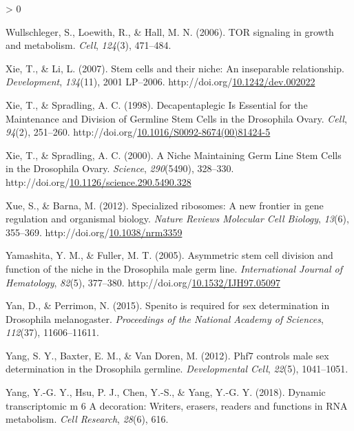 \documentclass[12pt,oneside]{reedthesis}
\newlength{\cslhangindent}
\newenvironment{CSLReferences}[2] %
 {%
  \setlength{\parindent}{0pt}
  \ifodd #1 \everypar{\setlength{\hangindent}{\cslhangindent}}\ignorespaces\fi
  \ifnum #2 > 0
  \setlength{\parskip}{#2\baselineskip}
  \fi
 }%
 {}
\begin{document}
\begin{CSLReferences}{1}{0}
\leavevmode\hypertarget{ref-Wullschleger2006b}{}%
Wullschleger, S., Loewith, R., \& Hall, M. N. (2006). {TOR} signaling in growth and metabolism. \emph{Cell}, \emph{124}(3), 471--484.

\leavevmode\hypertarget{ref-Xie2007a}{}%
Xie, T., \& Li, L. (2007). Stem cells and their niche: An inseparable relationship. \emph{Development}, \emph{134}(11), 2001 LP--2006. http://doi.org/\href{https://doi.org/10.1242/dev.002022}{10.1242/dev.002022}

\leavevmode\hypertarget{ref-Xie1998d}{}%
Xie, T., \& Spradling, A. C. (1998). Decapentaplegic {Is Essential} for the {Maintenance} and {Division} of {Germline Stem Cells} in the {Drosophila Ovary}. \emph{Cell}, \emph{94}(2), 251--260. http://doi.org/\href{https://doi.org/10.1016/S0092-8674(00)81424-5}{10.1016/S0092-8674(00)81424-5}

\leavevmode\hypertarget{ref-Xie2000b}{}%
Xie, T., \& Spradling, A. C. (2000). A {Niche Maintaining Germ Line Stem Cells} in the {Drosophila Ovary}. \emph{Science}, \emph{290}(5490), 328--330. http://doi.org/\href{https://doi.org/10.1126/science.290.5490.328}{10.1126/science.290.5490.328}

\leavevmode\hypertarget{ref-Xue2012}{}%
Xue, S., \& Barna, M. (2012). Specialized ribosomes: A new frontier in gene regulation and organismal biology. \emph{Nature Reviews Molecular Cell Biology}, \emph{13}(6), 355--369. http://doi.org/\href{https://doi.org/10.1038/nrm3359}{10.1038/nrm3359}

\leavevmode\hypertarget{ref-Yamashita2005d}{}%
Yamashita, Y. M., \& Fuller, M. T. (2005). Asymmetric stem cell division and function of the niche in the {Drosophila} male germ line. \emph{International Journal of Hematology}, \emph{82}(5), 377--380. http://doi.org/\href{https://doi.org/10.1532/IJH97.05097}{10.1532/IJH97.05097}

\leavevmode\hypertarget{ref-Yan2015}{}%
Yan, D., \& Perrimon, N. (2015). Spenito is required for sex determination in {Drosophila} melanogaster. \emph{Proceedings of the National Academy of Sciences}, \emph{112}(37), 11606--11611.

\leavevmode\hypertarget{ref-Yang2012}{}%
Yang, S. Y., Baxter, E. M., \& Van Doren, M. (2012). Phf7 controls male sex determination in the {Drosophila} germline. \emph{Developmental Cell}, \emph{22}(5), 1041--1051.

\leavevmode\hypertarget{ref-Yang2018}{}%
Yang, Y.-G. Y., Hsu, P. J., Chen, Y.-S., \& Yang, Y.-G. Y. (2018). Dynamic transcriptomic m 6 {A} decoration: Writers, erasers, readers and functions in {RNA} metabolism. \emph{Cell Research}, \emph{28}(6), 616.


\end{CSLReferences}
\end{document}
